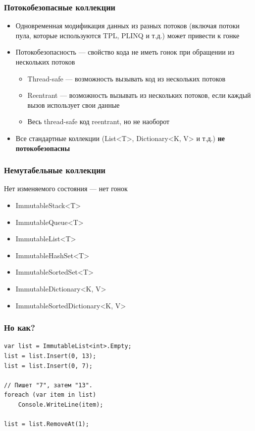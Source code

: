 \documentclass{../../slides-style}
\begin{document}
    \begin{frame}
        \frametitle{Потокобезопасные коллекции}
        \begin{itemize}
            \item Одновременная модификация данных из разных потоков (включая потоки пула, которые используются TPL, PLINQ и т.д.) может привести к гонке
            \item Потокобезопасность --- свойство кода не иметь гонок при обращении из нескольких потоков
            \begin{itemize}
                \item Thread-safe --- возможность вызывать код из нескольких потоков
                \item Reentrant --- возможность вызывать из нескольких потоков, если каждый вызов использует свои данные
                \item Весь thread-safe код reentrant, но не наоборот
            \end{itemize}
            \item Все стандартные коллекции (List<T>, Dictionary<K, V> и т.д.) \textbf{не потокобезопасны}
        \end{itemize}
    \end{frame}

    \begin{frame}
        \frametitle{Немутабельные коллекции}
        Нет изменяемого состояния --- нет гонок
        \begin{itemize}
            \item ImmutableStack<T>
            \item ImmutableQueue<T>
            \item ImmutableList<T>
            \item ImmutableHashSet<T>
            \item ImmutableSortedSet<T>
            \item ImmutableDictionary<K, V>
            \item ImmutableSortedDictionary<K, V>
        \end{itemize}
    \end{frame}

    \begin{frame}[fragile]
        \frametitle{Но как?}
        \begin{verbatim}
var list = ImmutableList<int>.Empty;
list = list.Insert(0, 13);
list = list.Insert(0, 7);

// Пишет "7", затем "13".
foreach (var item in list)
    Console.WriteLine(item);

list = list.RemoveAt(1);
        \end{verbatim}
    \end{frame}
\end{document}
